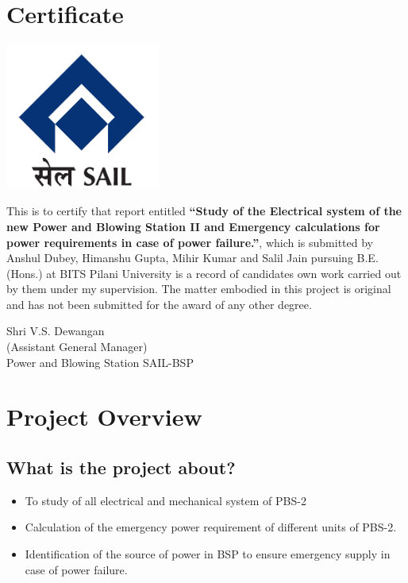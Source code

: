 \documentclass[english,11pt]{report}
\begin{document}
\chapter*{\centering Certificate}
\begin{center}
\includegraphics[width = 2in]{sail123.png}
\end{center}
This is to certify that report entitled \textbf{“Study of the Electrical system of the new Power and Blowing Station II and Emergency calculations for power requirements in case of power failure.”}, which is submitted by  Anshul Dubey, Himanshu Gupta, Mihir Kumar and Salil Jain pursuing B.E. (Hons.) at BITS Pilani University is a record of candidates own work carried out by them under my supervision. The matter embodied in this project is original and has not been submitted for the award of any other degree. \\[2em]
\begin{flushright}
Shri V.S. Dewangan\\ 
(Assistant General Manager)\\ 
Power and Blowing Station SAIL-BSP
\end{flushright}

\tableofcontents


\chapter{Project Overview}

\section{What is the project about?}

\begin{itemize}
\item To study of all electrical and mechanical system of PBS-2
\item Calculation of the emergency power requirement of different units of PBS-2.
\item Identification of the source of power in BSP to ensure emergency supply in case of power failure.
\end{itemize}
\end{document}
